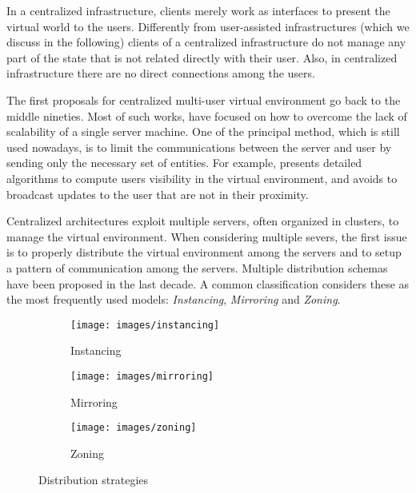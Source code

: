 \documentclass[final,10pt,a5paper]{phdimt}
\theoremstyle{definition}
\begin{document}
In a centralized infrastructure, clients merely work as interfaces to present the virtual world to the users. 
Differently from user-assisted infrastructures (which we discuss in the following) clients of a centralized infrastructure do not manage any part of the state that is not related directly with their user. Also, in centralized infrastructure there are no direct connections among the users.

The first proposals for centralized multi-user virtual environment go back to the middle nineties.
Most of such works, have focused on how to overcome the lack of scalability of a single server machine.
One of the principal method, which is still used nowadays, is to limit the communications between the server and user by sending only the necessary set of entities. For example, \cite{funkhouser1995ring} presents detailed algorithms to compute users visibility in the virtual environment, and avoids to broadcast updates to the user that are not in their proximity.

Centralized architectures exploit multiple servers, often organized in clusters, to manage the virtual environment. When considering multiple severs, the first issue is to properly distribute the virtual environment among the servers and to setup a pattern of communication among the servers. Multiple distribution schemas have been proposed in the last decade.
A common classification \cite{prodan2009prediction,glinka2007rtf}  considers these as the most frequently used models: \textit{Instancing}, \textit{Mirroring} and \textit{Zoning}.


\begin{figure}[tbh]
        \begin{subfigure}[b]{0.3\textwidth}
                \centering
                \texttt{[image: images/instancing]}
                \caption{Instancing}
                \label{fig:instancing}
        \end{subfigure}
        \quad
        \begin{subfigure}[b]{0.3\textwidth}
                \centering
                \texttt{[image: images/mirroring]}
                \caption{Mirroring}
                \label{fig:mirroring}
        \end{subfigure}
        \quad
        \begin{subfigure}[b]{0.3\textwidth}
                \centering
                \texttt{[image: images/zoning]}
                \caption{Zoning}
                \label{fig:zoning}
        \end{subfigure}
        \caption{Distribution strategies}\label{fig:dist-strategies}
\end{figure}
\end{document}
